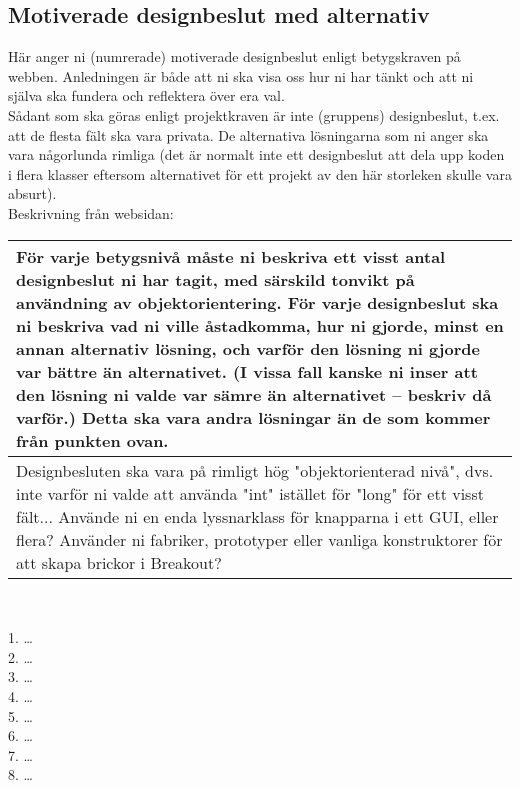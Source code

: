 \subsection{Motiverade designbeslut med alternativ}
{\color{red}Här anger ni (numrerade) motiverade designbeslut enligt betygskraven på webben.  Anledningen är både att ni ska visa oss hur ni har tänkt och att ni själva ska fundera och reflektera över era val.\\
Sådant som ska göras enligt projektkraven är inte (gruppens) designbeslut, t.ex. att de flesta fält ska vara privata.  De alternativa lösningarna som ni anger ska vara någorlunda rimliga (det är normalt inte ett designbeslut att dela upp koden i flera klasser eftersom alternativet för ett projekt av den här storleken skulle vara absurt).\\
Beskrivning från websidan:\\
\begin{tabular}{| p{11cm} |}
    \hline
    För varje betygsnivå måste ni beskriva ett visst antal designbeslut ni har tagit, med särskild tonvikt på användning av objektorientering. För varje designbeslut ska ni beskriva vad ni ville åstadkomma, hur ni gjorde, minst en annan alternativ lösning, och varför den lösning ni gjorde var bättre än alternativet. (I vissa fall kanske ni inser att den lösning ni valde var sämre än alternativet – beskriv då varför.) Detta ska vara andra lösningar än de som kommer från punkten ovan. \\ \hline
    Designbesluten ska vara på rimligt hög "objektorienterad nivå", dvs. inte varför ni valde att använda "int" istället för "long" för ett visst fält... Använde ni en enda lyssnarklass för knapparna i ett GUI, eller flera? Använder ni fabriker, prototyper eller vanliga konstruktorer för att skapa brickor i Breakout? \\ \hline
\end{tabular}\\}
\vspace{11pt}
1. \ldots \\
2. \ldots \\
3. \ldots \\
4. \ldots \\
5. \ldots \\
6. \ldots \\
7. \ldots \\
8. \ldots \\
